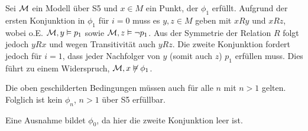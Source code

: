 Sei $\mathcal{M}$ ein Modell über S5 und $x \in M$ ein Punkt, der $\phi_1$ erfüllt. Aufgrund der ersten Konjunktion in
$\phi_1$ für $i = 0$ muss es $y, z \in M$ geben mit $xRy$ und $xRz$, wobei o.E. $\mathcal{M}, y \vDash p_1$ sowie
$\mathcal{M}, z \vDash \neg p_1$. Aus der Symmetrie der Relation $R$ folgt jedoch $yRx$ und wegen Transitivität auch
$yRz$. Die zweite Konjunktion fordert jedoch für $i = 1$, dass jeder Nachfolger von $y$ (somit auch $z$) $p_1$ erfüllen
muss. Dies führt zu einem Widerspruch, $\mathcal{M}, x \not\vDash \phi_1$.

Die oben geschilderten Bedingungen müssen auch für alle $n$ mit $n > 1$ gelten. Folglich ist kein $\phi_n$, $n > 1$ über
S5 erfüllbar.

Eine Ausnahme bildet $\phi_0$, da hier die zweite Konjunktion leer ist.


